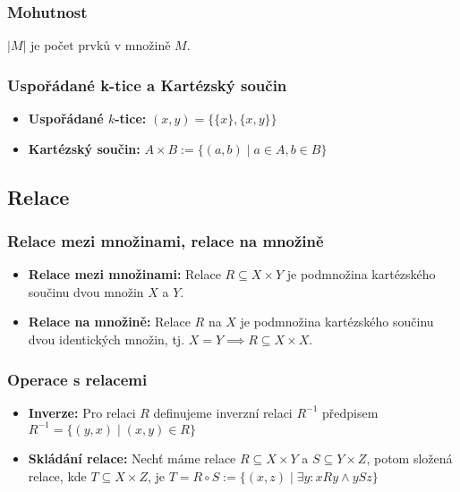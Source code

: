 \documentclass[10pt,a4paper]{article}
\begin{document}
\subsubsection{Mohutnost}

$|M|$ je počet prvků v množině $M$.

\subsubsection{Uspořádané k-tice a Kartézský součin}

\begin{itemize}
    \item \textbf{Uspořádané $k$-tice:} $(x,y)=\{\{x\},\{x,y\}\}$ 
    \item \textbf{Kartézský součin:} $A \times B := \{(a, b)\mid a \in A, b \in B\}$
\end{itemize}

\subsection{Relace}

\subsubsection{Relace mezi množinami, relace na množině}

\begin{itemize}
    \item \textbf{Relace mezi množinami:} Relace $R \subseteq X \times Y$ je podmnožina kartézského součinu dvou množin $X$ a $Y$.
    \item \textbf{Relace na množině:} Relace $R$ na $X$ je podmnožina kartézského součinu dvou identických množin, tj. $X=Y \implies R \subseteq X \times X$.
\end{itemize}

\subsubsection{Operace s relacemi}

\begin{itemize}
    \item \textbf{Inverze:}  Pro relaci $R$ definujeme inverzní relaci $R^{-1}$ předpisem $R^{-1} = \{(y,x)\mid (x,y) \in R\}$
    \item \textbf{Skládání relace:} Nechť máme relace $R \subseteq X \times Y$ a $S \subseteq Y \times Z$, potom složená relace, kde $T \subseteq X \times Z$, je $T = R \circ S := \{(x, z) \mid \exists y: xRy \land ySz\}$
\end{itemize}
\end{document}
